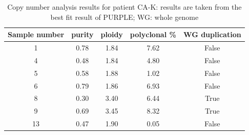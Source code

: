 \begin{table}[ht]
\caption[Copy number analysis results for patient CA-K]{Copy number analysis results for patient CA-K: results are taken from the best fit result of PURPLE; WG: whole genome}\label{tab:ca82cnv}
\centering
{}
\begin{tabular}{|c|c|c|c|c|}
\toprule
\hline
 \rowcolor{gray!50}
\textbf{Sample number} & \textbf{purity} & \textbf{ploidy} & \textbf{polyclonal \%} & \textbf{WG duplication}\\
\hline
 1 & \num{0.78} &	 \num{1.84} &	\num{7.62} & False	\\
 4 & \num{0.48} & \num{1.84} & \num{4.80} & False \\
 5 & \num{0.58} & \num{1.88} & \num{1.02} & False \\
 6 & \num{0.79} & \num{1.86} & \num{6.93} & False \\
 8 & \num{0.30} & \num{3.40} & \num{6.44} & True \\
 9 & \num{0.69} & \num{3.45} & \num{8.32} & True \\
 13 & \num{0.47} & \num{1.90} & \num{0.05} & False \\
 \hline
\bottomrule
\end{tabular}
\end{table} 

